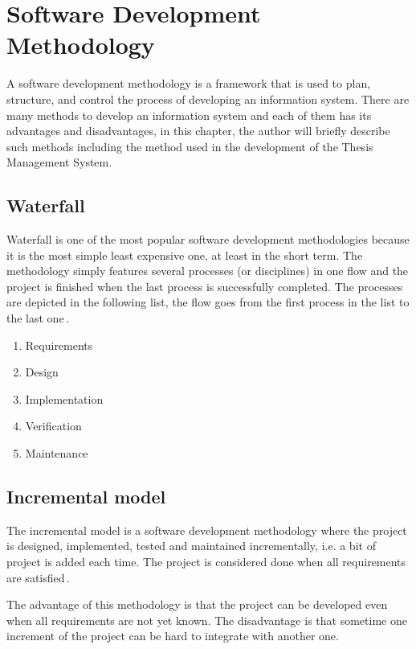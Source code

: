 \chapter{Software Development Methodology}

A software development methodology is a framework that is used to plan, structure, and control the process of developing an information system. There are many methods to develop an information system and each of them has its advantages and disadvantages, in this chapter, the author will briefly describe such methods including the method used in the development of the Thesis Management System.

\section{Waterfall}

Waterfall is one of the most popular software development methodologies because it is the most simple least expensive one, at least in the short term. The methodology simply features several processes (or disciplines) in one flow and the project is finished when the last process is successfully completed. The processes are depicted in the following list, the flow goes from the first process in the list to the last one\,\cite{agile-iterative-development}.

\begin{enumerate}
    \item Requirements
    \item Design
    \item Implementation
    \item Verification
    \item Maintenance
\end{enumerate}

\section{Incremental model}

The incremental model is a software development methodology where the project is designed, implemented, tested and maintained incrementally, i.e. a bit of project is added each time. The project is considered done when all requirements are satisfied\,\cite{agile-iterative-development}.

The advantage of this methodology is that the project can be developed even when all requirements are not yet known. The disadvantage is that sometime one increment of the project can be hard to integrate with another one.

